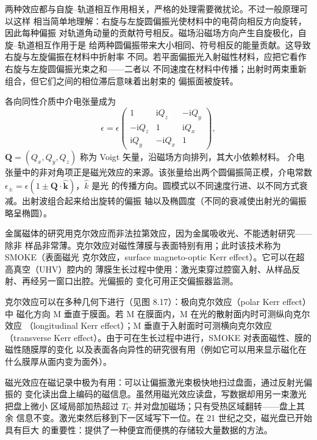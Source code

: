两种效应都与自旋--轨道相互作用相关，严格的处理需要微扰论。不过一般原理可以这样
相当简单地理解：右旋与左旋圆偏振光使材料中的电荷向相反方向旋转，因此每种偏振
对轨道角动量的贡献符号相反。磁场沿磁场方向产生自旋极化，自旋--轨道相互作用于是
给两种圆偏振带来大小相同、符号相反的能量贡献。这导致右旋与左旋偏振在材料中折射率
不同。若平面偏振光入射磁性材料，应把它看作右旋与左旋圆偏振光束之和——二者以
不同速度在材料中传播；出射时两束重新组合，但它们之间的相位滞后意味着出射束的
偏振面被旋转。

各向同性介质中介电张量成为
\begin{equation*}
\epsilon = \epsilon\begin{pmatrix} 1 & \mathrm{i}Q_z & -\mathrm{i}Q_y\\ -\mathrm{i}Q_z & 1 & \mathrm{i}Q_x\\ \mathrm{i}Q_y & -\mathrm{i}Q_x & 1 \end{pmatrix},\tag{8.7}
\end{equation*}
$\mathbf{Q}=(Q_x,Q_y,Q_z)$ 称为 Voigt 矢量，沿磁场方向排列，其大小依赖材料。
介电张量中的非对角项正是磁光效应的来源。该张量给出两个圆偏振简正模，介电常数
$\epsilon_{\pm}=\epsilon(1\pm\mathbf{Q}\cdot\hat{\mathbf{k}})$，$\hat{k}$ 是光
的传播方向。圆模式以不同速度行进、以不同方式衰减。出射波组合起来给出旋转的偏振
轴以及椭圆度（不同的衰减使出射光的偏振略呈椭圆）。

金属磁体的研究用克尔效应而非法拉第效应，因为金属吸收光、不能透射研究——除非
样品非常薄。克尔效应对磁性薄膜与表面特别有用；此时该技术称为 SMOKE（表面磁光
克尔效应，surface magneto-optic Kerr effect）。它可以在超高真空（UHV）腔内的
薄膜生长过程中使用：激光束穿过腔窗入射、从样品反射、再经另一窗口出腔。光偏振的
变化可用正交偏振器监测。

克尔效应可以在多种几何下进行（见图 8.17）：极向克尔效应（polar Kerr effect）中
磁化方向 M 垂直于膜面。若 M 在膜面内，M 在光的散射面内时可测纵向克尔效应
（longitudinal Kerr effect）；M 垂直于入射面时可测横向克尔效应（transverse
Kerr effect）。由于可在生长过程中进行，SMOKE 对表面磁性、膜的磁性随膜厚的变化
以及表面各向异性的研究很有用（例如它可以用来显示磁化在什么膜厚从面内变为面外）。

磁光效应在磁记录中极为有用：可以让偏振激光束极快地扫过盘面，通过反射光偏振的
变化读出盘上编码的磁信息。虽然用磁光效应读盘，写数据却用另一束激光把盘上微小
区域局部加热超过 $T_{\mathrm{C}}$ 并对盘加磁场；只有受热区域翻转——盘上其余
信息不变。激光束然后移到下一区域写下一位。在 21 世纪之交，磁光盘已开始具有巨大
的重要性：提供了一种便宜而便携的存储较大量数据的方法。

